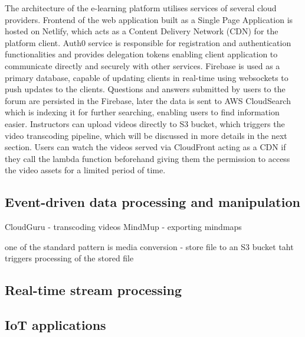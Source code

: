 The architecture of the e-learning platform utilises services of several cloud providers. Frontend of the web application built as a Single Page Application is hosted on Netlify, which acts as a Content Delivery Network (CDN) for the platform client. Auth0 service is responsible for registration and authentication functionalities and provides delegation tokens enabling client application to communicate directly and securely with other services. Firebase is used as a primary database, capable of updating clients in real-time using websockets to push updates to the clients. Questions and answers submitted by users to the forum are persisted in the Firebase, later the data is sent to AWS CloudSearch which is indexing it for further searching, enabling users to find information easier. Instructors can upload videos directly to S3 bucket, which triggers the video transcoding pipeline, which will be discussed in more details in the next section. Users can watch the videos served via CloudFront acting as a CDN if they call the lambda function beforehand giving them the permission to access the video assets for a limited period of time.

\subsection*{Event-driven data processing and manipulation}


CloudGuru - transcoding videos
MindMup - exporting mindmaps

\cite{MartinFowlerServerless}

one of the standard pattern is media conversion - store file to an S3 bucket taht triggers processing of the stored file


\subsection*{Real-time stream processing}

\subsection*{IoT applications}

